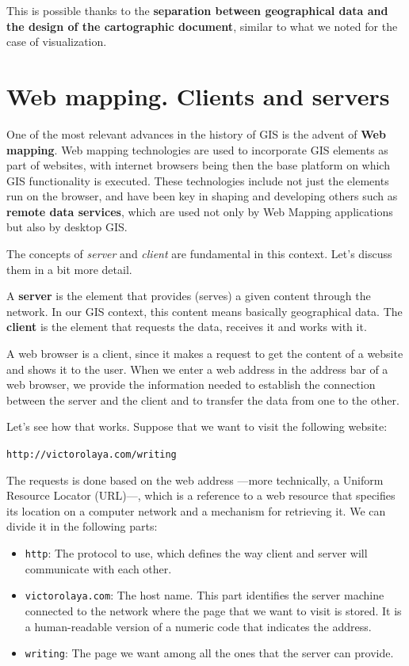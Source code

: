 This is possible thanks to the \textbf{separation between geographical data and the design of the cartographic document}, similar to what we noted for the case of visualization.


\section{Web mapping. Clients and servers}

One of the most relevant advances in the history of GIS is the advent of \textbf{Web mapping}. Web mapping technologies are used to incorporate GIS elements as part of websites, with internet browsers being then the base platform on which GIS functionality is executed. These technologies include not just the elements run on the browser, and have been key in shaping and developing others such as \textbf{remote data services}, which are used not only by Web Mapping applications but also by desktop GIS.

The concepts of \emph{server} and \emph{client} are fundamental in this context. Let's discuss them in a bit more detail.

A \textbf{server} is the element that provides (serves) a given content through the network. In our GIS context, this content means basically geographical data. The \textbf{client} is the element that requests the data, receives it and works with it. 

A web browser is a client, since it makes a request to get the content of a website and shows it to the user. When we enter a web address in the address bar of a web browser, we provide the information needed to establish the connection between the server and the client and to transfer the data from one to the other.

Let's see how that works. Suppose that we want to visit the following website:

\begin{center}
\small\texttt{http://victorolaya.com/writing}
\end{center}

The requests is done based on the web address ---more technically, a Uniform Resource Locator (URL)---, which is a reference to a web resource that specifies its location on a computer network and a mechanism for retrieving it. We can divide it in the following parts:

\begin{itemize}
	\item \texttt{http}: The protocol to use, which defines the way client and server will communicate with each other.
	\item \texttt{victorolaya.com}: The host name. This part identifies the server machine connected to the network where the page that we want to visit is stored. It is a human-readable version of a numeric code that indicates the address.
	\item \texttt{writing}: The page we want among all the ones that the server can provide. 
\end{itemize}

